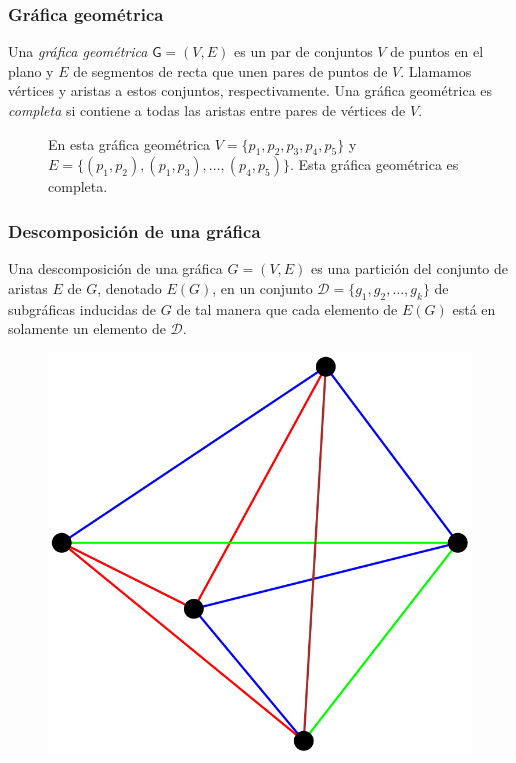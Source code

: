 \begin{frame}
\frametitle{Gráfica geométrica}
Una \emph{gráfica geométrica} $\mathsf{G}=(V,E)$ es un par de conjuntos $V$ de puntos en el plano y $E$ de 
segmentos de recta que unen pares de puntos de $V$. Llamamos vértices y aristas a estos conjuntos,
respectivamente. Una gráfica geométrica es \emph{completa} si contiene a todas las 
aristas entre pares de vértices de $V$.
\begin{figure}
	\centering
	\caption{En esta gráfica geométrica $V=\{p_1,p_2,p_3,p_4,p_5\}$ y $E=\{(p_1,p_2),(p_1,p_3),\dots,(p_4,p_5)\}			$. Esta gráfica geométrica es completa.}
\end{figure}
\end{frame}
\begin{frame}
\frametitle{Descomposición de una gráfica}
Una descomposición de una gráfica $G=(V,E)$ es una partición del conjunto de aristas $E$ de $G$, denotado $E(G)$, en un conjunto $\mathcal{D} = \{g_1,g_2,\dots,g_k \}$ de subgráficas inducidas de $G$ de tal manera que cada elemento de $E(G)$ está en solamente un elemento de $\mathcal{D}$.
\begin{figure}
	\centering
	\includegraphics[width=0.4\linewidth]{images/decomposition_example}
\end{figure}
\end{frame}
